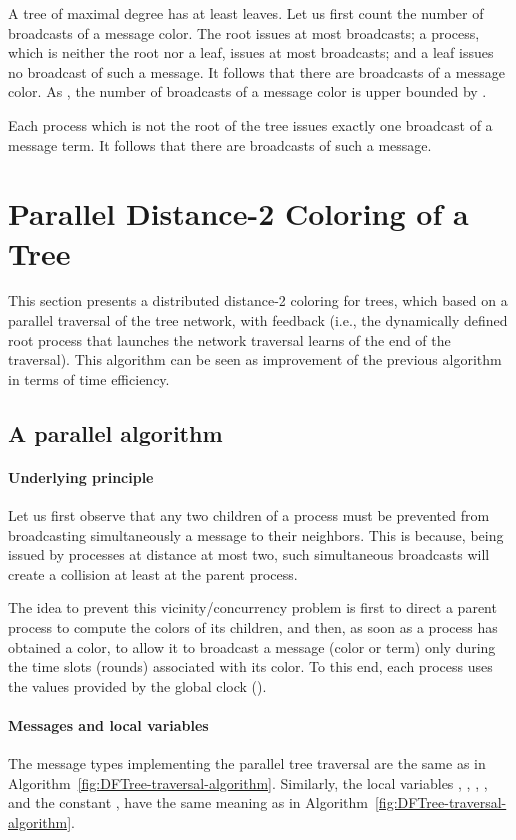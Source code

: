 \documentclass[11pt,english]{article}
\begin{document}
A tree of maximal degree  has at least  leaves.  
Let us first count the number of broadcasts of a message  {\sc color}. 
The root issues at most   broadcasts; 
a process, which is neither the root nor a leaf, issues
at most   broadcasts; and a leaf  issues no broadcast
of such a message. It follows that there are 
  broadcasts of a message  
{\sc color}. As , the number of broadcasts of 
a message {\sc color}  is upper bounded by .  
 
Each process which is not the root of the tree  issues exactly one 
broadcast  of a message {\sc term}. It follows that there are 
broadcasts  of such a message. 


\section{Parallel Distance-2  Coloring of a Tree}
\label{sec:parallel-d2-tree-algorithm}


This section presents a distributed distance-2 coloring for trees,
which based on a parallel traversal of the tree network, with feedback
(i.e., the dynamically defined root process that launches the network
traversal learns of the end of the traversal).  This algorithm can be
seen as improvement of the previous algorithm in terms of time
efficiency.



\subsection{A parallel algorithm}
\paragraph{Underlying principle}
Let us first observe that any two children of a process must be prevented 
from  broadcasting simultaneously a message to their neighbors. 
This is because, being issued by processes at  distance at most two, 
such simultaneous broadcasts will create a collision at least at the
parent process. 


The idea to prevent this vicinity/concurrency problem is first to
direct a parent process to compute the colors of its children, and
then, as soon as a process has obtained a color, to allow it to broadcast 
a message ({\sc color} or {\sc term}) only during the time slots
(rounds) associated with its color.  To this end, each process uses
the values provided by the global clock ().


\paragraph{Messages and local variables}
The message types implementing the parallel tree traversal are the
same as in Algorithm~\ref{fig:DFTree-traversal-algorithm}.  Similarly,
the local variables , , ,
, and the constant , have the same meaning
as in Algorithm~\ref{fig:DFTree-traversal-algorithm}.
\end{document}
